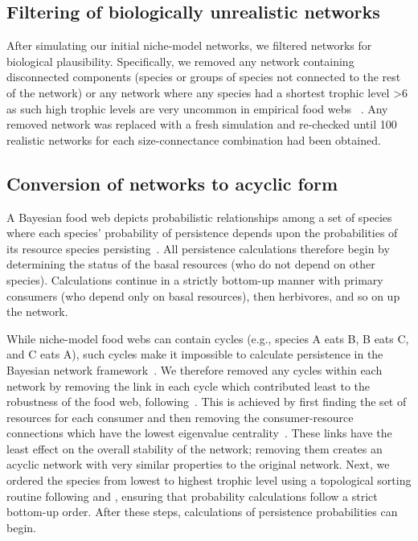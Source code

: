 \documentclass[12pt]{article}
\begin{document}
\begin{spacing}{2.0}
    
    \subsection*{Filtering of biologically unrealistic networks}

        After simulating our initial niche-model networks, we filtered networks for biological plausibility.
        Specifically, we removed any network containing disconnected components (species or groups of species not connected to the rest of the network) or any network where any species had a shortest trophic level \textgreater6 as such high trophic levels are very uncommon in empirical food webs ~\citep{Riede2011}.
        Any removed network was replaced with a fresh simulation and re-checked until 100 realistic networks for each size-connectance combination had been obtained.
    

    \subsection*{Conversion of networks to acyclic form}

        A Bayesian food web depicts probabilistic relationships among a set of species where each species' probability of persistence depends upon the probabilities of its resource species persisting~\citep{Jensen_Nielsen,Eklof2013}. 
        All persistence calculations therefore begin by determining the status of the basal resources (who do not depend on other species).
        Calculations continue in a strictly bottom-up manner with primary consumers (who depend only on basal resources), then herbivores, and so on up the network.

            
        While niche-model food webs can contain cycles (e.g., species A eats B, B eats C, and C eats A), such cycles make it impossible to calculate persistence in the Bayesian network framework~\citep{Tarjan1972}. 
        We therefore removed any cycles within each network by removing the link in each cycle which contributed least to the robustness of the food web, following~\citet{Allesina2009functional}.
        This is achieved by first finding the set of resources for each consumer and then removing the consumer-resource connections which have the lowest eigenvalue centrality~\citep{Allesina2009functional}.
        These links have the least effect on the overall stability of the network; removing them creates an acyclic network with very similar properties to the original network.
        Next, we ordered the species from lowest to highest trophic level using a topological sorting routine following \citet{Tarjan1972} and \citet{Allesinaetal2005}, ensuring that probability calculations follow a strict bottom-up order. 
        After these steps, calculations of persistence probabilities can begin.
        


\end{spacing}
\end{document}

